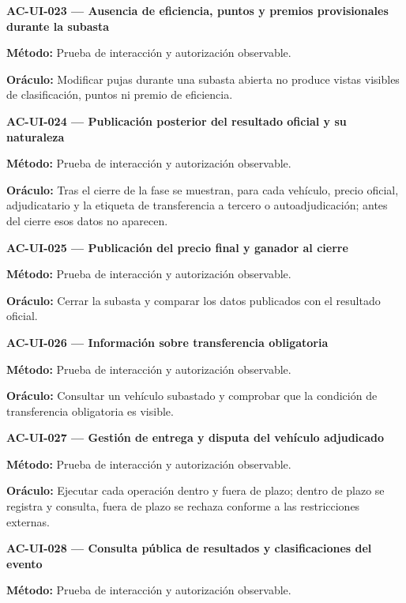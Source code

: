\documentclass[10pt,letterpaper]{article}
\begin{document}
\noindent\textbf{AC-UI-023 --- Ausencia de eficiencia, puntos y premios provisionales durante la subasta}\par
\textbf{Método:} Prueba de interacción y autorización observable.\par
\textbf{Oráculo:} Modificar pujas durante una subasta abierta no produce vistas visibles de clasificación, puntos ni premio de eficiencia.\par\vspace{0.45em}
\noindent\textbf{AC-UI-024 --- Publicación posterior del resultado oficial y su naturaleza}\par
\textbf{Método:} Prueba de interacción y autorización observable.\par
\textbf{Oráculo:} Tras el cierre de la fase se muestran, para cada vehículo, precio oficial, adjudicatario y la etiqueta de transferencia a tercero o autoadjudicación; antes del cierre esos datos no aparecen.\par\vspace{0.45em}
\noindent\textbf{AC-UI-025 --- Publicación del precio final y ganador al cierre}\par
\textbf{Método:} Prueba de interacción y autorización observable.\par
\textbf{Oráculo:} Cerrar la subasta y comparar los datos publicados con el resultado oficial.\par\vspace{0.45em}
\noindent\textbf{AC-UI-026 --- Información sobre transferencia obligatoria}\par
\textbf{Método:} Prueba de interacción y autorización observable.\par
\textbf{Oráculo:} Consultar un vehículo subastado y comprobar que la condición de transferencia obligatoria es visible.\par\vspace{0.45em}
\noindent\textbf{AC-UI-027 --- Gestión de entrega y disputa del vehículo adjudicado}\par
\textbf{Método:} Prueba de interacción y autorización observable.\par
\textbf{Oráculo:} Ejecutar cada operación dentro y fuera de plazo; dentro de plazo se registra y consulta, fuera de plazo se rechaza conforme a las restricciones externas.\par\vspace{0.45em}
\noindent\textbf{AC-UI-028 --- Consulta pública de resultados y clasificaciones del evento}\par
\textbf{Método:} Prueba de interacción y autorización observable.\par
\end{document}
